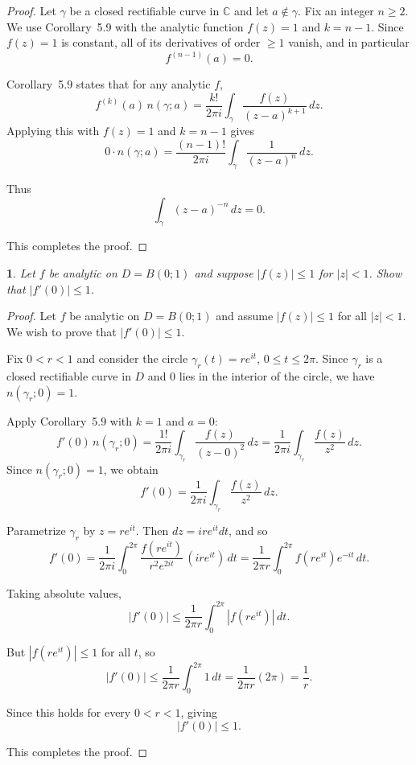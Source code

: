 \documentclass[12pt, a4paper]{report}
\theoremstyle{spaced}
\newtheorem{exercise}{}
\newcommand{\setexercise}[1]{\setcounter{exercise}{#1-1}}
\begin{document}
\begin{proof}
	Let $\gamma$ be a closed rectifiable curve in $\mathbb{C}$ and let $a\notin\gamma$.
	Fix an integer $n\ge 2$.
	We use Corollary~5.9 with the analytic function $f(z)=1$ and $k=n-1$.
	Since $f(z)=1$ is constant, all of its derivatives of order $\ge 1$ vanish, and in
	particular
	\[
		f^{(n-1)}(a)=0.
	\]

	Corollary~5.9 states that for any analytic $f$,
	\[
		f^{(k)}(a)\, n(\gamma;a)
		= \frac{k!}{2\pi i} \int_\gamma \frac{f(z)}{(z-a)^{k+1}}\, dz.
	\]
	Applying this with $f(z)=1$ and $k=n-1$ gives
	\[
		0 \cdot n(\gamma;a)
		= \frac{(n-1)!}{2\pi i} \int_\gamma \frac{1}{(z-a)^n}\, dz.
	\]

	Thus
	\[
		\int_\gamma (z-a)^{-n}\, dz = 0.
	\]

	This completes the proof.
\end{proof}

\setexercise{6}
\begin{exercise}
	Let $f$ be analytic on $D = B(0;1)$ and suppose $|f(z)| \le 1$ for $|z| < 1$.
	Show that $|f'(0)| \le 1$.
\end{exercise}

\begin{proof}
	Let $f$ be analytic on $D=B(0;1)$ and assume $|f(z)|\le 1$ for all $|z|<1$.
	We wish to prove that $|f'(0)|\le 1$.

	Fix $0<r<1$ and consider the circle $\gamma_r(t)=re^{it}$, $0\le t\le 2\pi$.
	Since $\gamma_r$ is a closed rectifiable curve in $D$ and $0$ lies in the interior of
	the circle, we have $n(\gamma_r;0)=1$.

	Apply Corollary~5.9 with $k=1$ and $a=0$:
	\[
		f'(0)\, n(\gamma_r;0)
		=
		\frac{1!}{2\pi i}
		\int_{\gamma_r} \frac{f(z)}{(z-0)^{2}}\,dz
		=
		\frac{1}{2\pi i}
		\int_{\gamma_r} \frac{f(z)}{z^{2}}\,dz.
	\]
	Since $n(\gamma_r;0)=1$, we obtain
	\[
		f'(0)
		= \frac{1}{2\pi i} \int_{\gamma_r} \frac{f(z)}{z^{2}}\,dz.
	\]

	Parametrize $\gamma_r$ by $z=re^{it}$.
	Then $dz = i r e^{it}dt$, and so
	\[
		f'(0)
		= \frac{1}{2\pi i}
		\int_{0}^{2\pi}
		\frac{f(re^{it})}{r^{2} e^{2it}}\, (i r e^{it})\, dt
		=
		\frac{1}{2\pi r}
		\int_{0}^{2\pi} f(re^{it}) e^{-it}\, dt.
	\]

	Taking absolute values,
	\[
		|f'(0)|
		\le \frac{1}{2\pi r}
		\int_{0}^{2\pi} |f(re^{it})|\, dt.
	\]

	But $|f(re^{it})|\le 1$ for all $t$, so
	\[
		|f'(0)|
		\le \frac{1}{2\pi r} \int_{0}^{2\pi} 1\, dt
		= \frac{1}{2\pi r} (2\pi)
		= \frac{1}{r}.
	\]

	Since this holds for every $0<r<1$, giving
	\[
		|f'(0)| \le 1.
	\]

	This completes the proof.
\end{proof}
\end{document}
